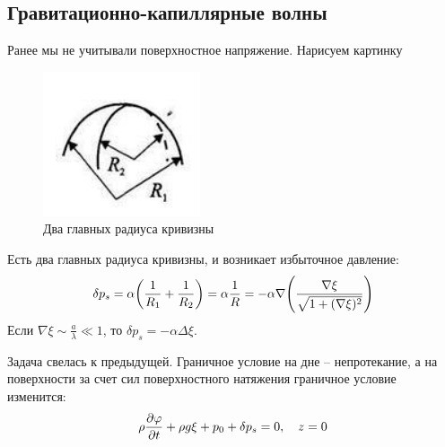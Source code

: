 \newpage
\subsection{Гравитационно-капиллярные волны}
Ранее мы не учитывали поверхностное напряжение. Нарисуем картинку

\begin{figure}[H]
    \centering
    \includegraphics[scale=1]{photo/2rad.png}
    \caption{Два главных радиуса кривизны}
    \label{fig:figure1}
\end{figure}

Есть два главных радиуса кривизны, и возникает избыточное давление:
\begin{equation}
    \delta p_s = \alpha\qty(\frac{1}{R_1}+\frac{1}{R_2}) = \alpha \frac{1}{R} = -\alpha\nabla \qty(\frac{\nabla\xi}{\sqrt{1+(\nabla\xi)^2}})
\end{equation}
Если $\nabla\xi \sim \frac{a}{\lambda} \ll 1$, то $\delta p_s = -\alpha \Delta \xi$.

Задача свелась к предыдущей. Граничное условие на дне -- непротекание, а на поверхности за счет сил поверхностного натяжения граничное условие изменится:
\begin{equation}
    \rho\pdv{\varphi}{t}+\rho g\xi+p_0+\delta p_s = 0, \quad z = 0
\end{equation}

